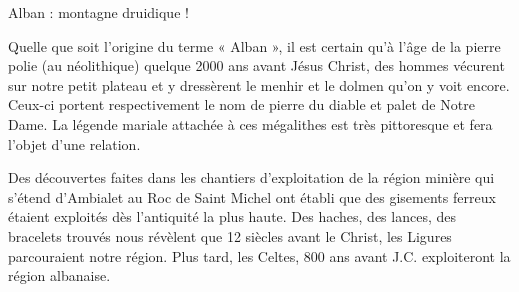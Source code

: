
\thispagestyle{plain}


\vspace*{12mm}

\begin{center}
    {\titlefont\fontsize{30}{36}\selectfont
    Alban : montagne druidique !}
\end{center}

\vspace{23mm}


Quelle que soit l'origine du terme « Alban », il est certain
qu'à l'âge de la pierre polie (au néolithique) quelque
2000 ans avant Jésus Christ, des hommes vécurent
sur notre petit plateau et y dressèrent le menhir et le
dolmen qu'on y voit encore. Ceux-ci portent respectivement
le nom de pierre du diable et palet de Notre Dame.
La légende mariale attachée à ces mégalithes est très
pittoresque et fera l'objet d'une relation.


\vspace{13mm}



Des découvertes faites dans les chantiers d'exploitation
de la région minière qui s'étend d'Ambialet au Roc
de Saint Michel ont établi que des gisements ferreux
étaient exploités dès l'antiquité la plus haute.
Des haches, des lances, des bracelets trouvés nous
révèlent que 12 siècles avant le Christ, les Ligures
parcouraient notre région. Plus tard, les Celtes,
800 ans avant J.C. exploiteront la région albanaise.

